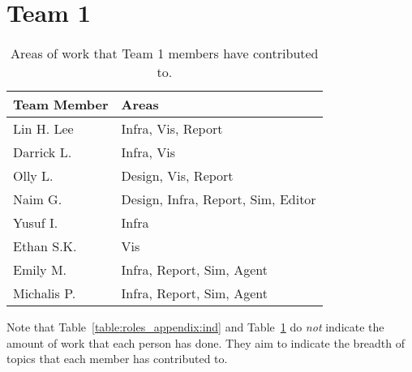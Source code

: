 \section{Team 1}
\label{sec:roles_appendix:team1}

\begin{table}[H]
    \centering
    \begin{tabular}{|l|l|}
    \hline
    \textbf{Team Member} & \textbf{Areas}            \\ \hline
    Lin H. Lee  & Infra, Vis, Report                 \\
    Darrick L.  & Infra, Vis                         \\
    Olly L.     & Design, Vis, Report                \\
    Naim G.     & Design, Infra, Report, Sim, Editor \\
    Yusuf I.    & Infra                              \\
    Ethan S.K.  & Vis                                \\
    Emily M.    & Infra, Report, Sim, Agent          \\
    Michalis P. & Infra, Report, Sim, Agent          \\ \hline
\end{tabular}
\caption{Areas of work that Team 1 members have contributed to.}
\label{sec:roles_appendix:team1}
\end{table}

Note that Table~\ref{table:roles_appendix:ind} and Table~\ref{sec:roles_appendix:team1} do \emph{not} indicate the amount of work that each person has done. They aim to indicate the breadth of topics that each member has contributed to. 
